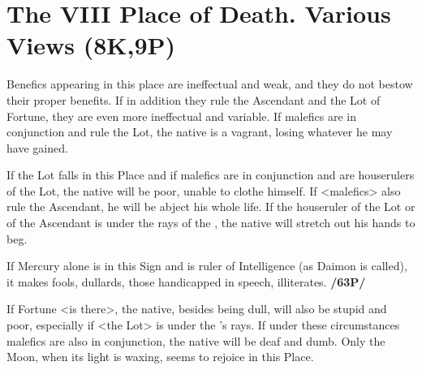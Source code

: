 \section{The VIII Place of Death. Various Views (8K,9P)}
Benefics appearing in this place are ineffectual and weak, and they do not bestow their proper benefits. If in addition they rule the Ascendant and the Lot of Fortune, they are even more ineffectual and variable. If malefics are in conjunction and rule the Lot, the native is a vagrant, losing whatever he may have gained.

If the Lot falls in this Place and if malefics are in conjunction and are houserulers of the Lot, the native will be poor, unable to clothe himself. If <malefics> also rule the Ascendant, he will be abject his whole life. If the houseruler of the Lot or of the Ascendant is under the rays of the \Sun, the native will stretch out his hands to beg. 

If Mercury alone is in this Sign and is ruler of Intelligence (as Daimon is called), it makes fools, dullards, those handicapped in speech, illiterates. \textbf{/63P/}

If Fortune <is there>, the native, besides being dull, will also be stupid and poor, especially if <the Lot> is under the \Sun's rays. If under these circumstances malefics are also in conjunction, the native will be deaf and dumb.  Only the Moon, when its light is waxing, seems to rejoice in this Place.

\newpage